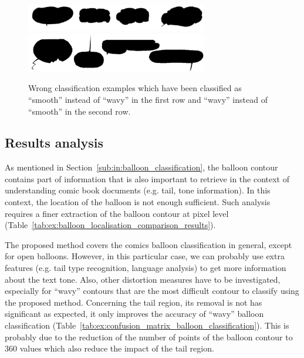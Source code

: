   \begin{figure}[h]  %
    \centering
    \includegraphics[trim = 0mm 0mm 0mm 0mm, clip, width=300px]{bad_detection.png}
    \includegraphics[trim = 0mm 0mm 0mm 0mm, clip, width=300px]{wavy_instead_smooth.png}
    \caption[Wrong balloon classification examples]{Wrong classification examples which have been classified as ``smooth'' instead of  ``wavy'' in the first row and ``wavy'' instead of  ``smooth'' in the second row.}
    \label{fig:bad_detection_balloon_classification}
  \end{figure}


\subsection{Results analysis} %
\label{par:balloon_classification_analysis}

As mentioned in Section~\ref{sub:in:balloon_classification}, the balloon contour contains part of information that is also important to retrieve in the context of understanding comic book documents (e.g. tail, tone information).
In this context, the location of the balloon is not enough sufficient.
Such analysis requires a finer extraction of the balloon contour at pixel level (Table~\ref{tab:ex:balloon_localisation_comparison_results}).

The proposed method covers the comics balloon classification in general, except for open balloons.
However, in this particular case, we can probably use extra features (e.g. tail type recognition, language analysis) to get more information about the text tone.
Also, other distortion measures have to be investigated, especially for ``wavy'' contours that are the most difficult contour to classify using the proposed method.
Concerning the tail region, its removal is not has significant as expected, it only improves the accuracy of ``wavy'' balloon classification (Table~\ref{tab:ex:confusion_matrix_balloon_classification}).
This is probably due to the reduction of the number of points of the balloon contour to 360 values which also reduce the impact of the tail region.

